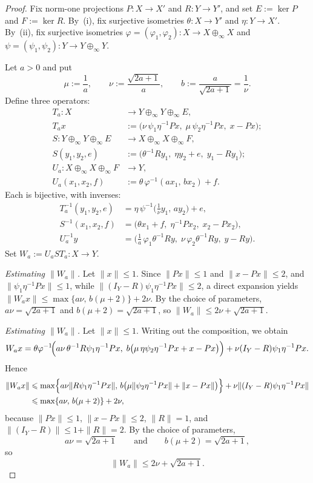 \documentclass[10pt,a4paper]{amsart}
\renewcommand{\le}{\leqslant}
\begin{document}
\begin{proof}
Fix norm-one projections $P\colon X\to X'$ and $R\colon Y\to Y'$, and
set $E:=\ker P$ and $F:=\ker R$.  By~(i), fix surjective isometries
$\theta\colon X\to Y'$ and $\eta\colon Y\to X'$.  By~(ii), fix
surjective isometries
$\varphi=(\varphi_1,\varphi_2)\colon X\to X\oplus_\infty X$ and
$\psi=(\psi_1,\psi_2)\colon Y\to Y\oplus_\infty Y$.

Let $a>0$ and put
\[
\mu:=\frac{1}{a},\qquad
\nu:=\frac{\sqrt{2a+1}}{a},\qquad
b:=\frac{a}{\sqrt{2a+1}}=\frac{1}{\nu}.
\]
Define three operators:
\begin{align*}
T_a\colon X&\to Y\oplus_\infty Y\oplus_\infty E,\\
T_a x&:=\bigl(\nu\,\psi_1\eta^{-1}Px,\;
\mu\,\psi_2\eta^{-1}Px,\; x-Px\bigr);\\[2mm]
S\colon Y\oplus_\infty Y\oplus_\infty E
&\to X\oplus_\infty X\oplus_\infty F,\\
S(y_1,y_2,e)&:=\bigl(\theta^{-1}Ry_1,\;
\eta y_2+e,\; y_1-Ry_1\bigr);\\[2mm]
U_a\colon X\oplus_\infty X\oplus_\infty F&\to Y,\\
U_a(x_1,x_2,f)&:=\theta\,\varphi^{-1}(ax_1,\,bx_2)+f.
\end{align*}
Each is bijective, with inverses:
\begin{align*}
T_a^{-1}(y_1,y_2,e)
&=\eta\,\psi^{-1}\!\bigl(\tfrac{1}{\nu}y_1,\,ay_2\bigr)+e,\\
S^{-1}(x_1,x_2,f)
&=\bigl(\theta x_1+f,\;\eta^{-1}Px_2,\;x_2-Px_2\bigr),\\
U_a^{-1}y
&=\bigl(\tfrac{1}{a}\,\varphi_1\theta^{-1}Ry,\;
\nu\,\varphi_2\theta^{-1}Ry,\;y-Ry\bigr).
\end{align*}
Set $W_a:=U_aST_a\colon X\to Y$.

\smallskip
\noindent\emph{Estimating $\|W_a\|$.}
Let $\|x\|\le 1$.  Since $\|Px\|\le 1$ and $\|x-Px\|\le 2$,
and $\|\psi_1\eta^{-1}Px\|\le 1$, while
$\|(I_Y-R)\psi_1\eta^{-1}Px\|\le 2$, a direct expansion yields
$\|W_ax\|\le\max\{a\nu,\,b(\mu+2)\}+2\nu$.
By the choice of parameters, $a\nu=\sqrt{2a+1}$ and
$b(\mu+2)=\sqrt{2a+1}$, so
$\|W_a\|\le 2\nu+\sqrt{2a+1}$.

\smallskip
\noindent\emph{Estimating $\|W_a\|$.}
Let $\|x\|\le 1$.  Writing out the composition, we obtain
\[
W_ax
=
\theta\varphi^{-1}\!\Bigl(
a\nu\,\theta^{-1}R\psi_1\eta^{-1}Px,\;
b\bigl(\mu\,\eta\psi_2\eta^{-1}Px+x-Px\bigr)
\Bigr)
+
\nu(I_Y-R)\psi_1\eta^{-1}Px.
\]
Hence
\begin{align*}
\|W_ax\|
&\le
\max\Bigl\{
a\nu\|R\psi_1\eta^{-1}Px\|,
\,b\bigl(\mu\|\psi_2\eta^{-1}Px\|+\|x-Px\|\bigr)
\Bigr\}
+\nu\|(I_Y-R)\psi_1\eta^{-1}Px\| \\
&\le \max\{a\nu,\,b(\mu+2)\}+2\nu,
\end{align*}
because $\|Px\|\le 1$, $\|x-Px\|\le 2$, $\|R\|=1$, and
$\|(I_Y-R)\|\le 1+\|R\|=2$.
By the choice of parameters,
\[
a\nu=\sqrt{2a+1}
\qquad\text{and}\qquad
b(\mu+2)=\sqrt{2a+1},
\]
so
\[
\|W_a\|\le 2\nu+\sqrt{2a+1}.
\]


\end{proof}
\end{document}
